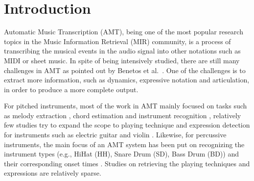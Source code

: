 \documentclass{article}
\begin{document}
%

\section{Introduction}\label{sec:introduction}

Automatic Music Transcription (AMT), being one of the most popular research topics in the Music Information Retrieval (MIR) community, is a process of transcribing the musical events in the audio signal into other notations such as MIDI or sheet music. In spite of being intensively studied, there are still many challenges in AMT as pointed out by Benetos et al.~\cite{Benetos2013}. One of the challenges is to extract more information, such as dynamics, expressive notation and articulation, in order to produce a more complete output. 

For pitched instruments, most of the work in AMT mainly focused on tasks such as melody extraction \cite{Bittner2015a}, chord estimation \cite{Humphrey2015} and instrument recognition \cite{Hamel2009}, relatively few studies try to expand the scope to playing technique and expression detection for instruments such as electric guitar \cite{Su2014a, Chen2015} and violin \cite{Li2015a}. Likewise, for percussive instruments, the main focus of an AMT system has been put on recognizing the instrument types (e.g., HiHat (HH), Snare Drum (SD), Bass Drum (BD)) and their corresponding onset times \cite{Benetos2014, Dittmar2014, Thompson2014, Roebel2015, Wu2015a}. Studies on retrieving the playing techniques and expressions are relatively sparse. 
\end{document}
